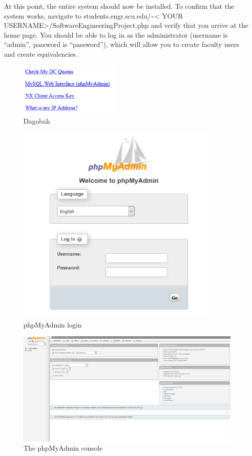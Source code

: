 \documentclass{article}
\begin{document}
\par At this point, the entire system should now be installed. To confirm that
the system works, navigate to students.engr.scu.edu/\textasciitilde \textless
YOUR USERNAME\textgreater /SoftwareEngineeringProject.php and verify that you
arrive at the home page.  You should be able to log in as the administrator
(username is ``admin'', password is ``password''), which will allow you to
create faculty users and create equivalencies.

\begin{figure}[h]
\includegraphics[width=5cm]{dagobah}
\centering
\caption{Dagobah}
\label{fig:dagobah}
\end{figure}

\begin{figure}[h]
\includegraphics[width=10cm]{phpmyadminlogin}
\centering
\caption{phpMyAdmin login}
\label{fig:phpmyadminlogin}
\end{figure}

\begin{figure}[h]
\includegraphics[width=15cm]{phpmyadmin}
\centering
\caption{The phpMyAdmin console}
\label{fig:phpmyadmin}
\end{figure}
\end{document}
